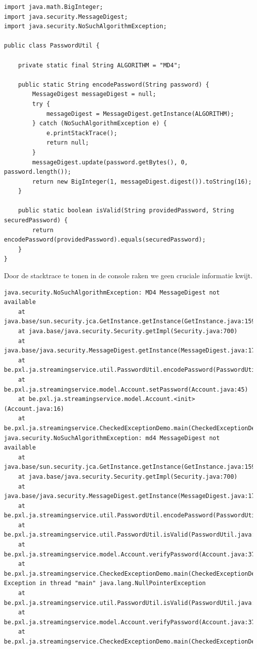 \documentclass{tstextbook}
\begin{document}
\begin{lstlisting}
import java.math.BigInteger;
import java.security.MessageDigest;
import java.security.NoSuchAlgorithmException;

public class PasswordUtil {

	private static final String ALGORITHM = "MD4";

	public static String encodePassword(String password) {
		MessageDigest messageDigest = null;
		try {
			messageDigest = MessageDigest.getInstance(ALGORITHM);
		} catch (NoSuchAlgorithmException e) {
			e.printStackTrace();
			return null;
		}
		messageDigest.update(password.getBytes(), 0, password.length());
		return new BigInteger(1, messageDigest.digest()).toString(16);
	}

	public static boolean isValid(String providedPassword, String securedPassword) {
		return encodePassword(providedPassword).equals(securedPassword);
	}
}
\end{lstlisting}
 
Door de stacktrace te tonen in de console raken we geen cruciale informatie kwijt.

\begin{verbatim}
java.security.NoSuchAlgorithmException: MD4 MessageDigest not available
	at java.base/sun.security.jca.GetInstance.getInstance(GetInstance.java:159)
	at java.base/java.security.Security.getImpl(Security.java:700)
	at java.base/java.security.MessageDigest.getInstance(MessageDigest.java:177)
	at be.pxl.ja.streamingservice.util.PasswordUtil.encodePassword(PasswordUtil.java:15)
	at be.pxl.ja.streamingservice.model.Account.setPassword(Account.java:45)
	at be.pxl.ja.streamingservice.model.Account.<init>(Account.java:16)
	at be.pxl.ja.streamingservice.CheckedExceptionDemo.main(CheckedExceptionDemo.java:8)
java.security.NoSuchAlgorithmException: md4 MessageDigest not available
	at java.base/sun.security.jca.GetInstance.getInstance(GetInstance.java:159)
	at java.base/java.security.Security.getImpl(Security.java:700)
	at java.base/java.security.MessageDigest.getInstance(MessageDigest.java:177)
	at be.pxl.ja.streamingservice.util.PasswordUtil.encodePassword(PasswordUtil.java:15)
	at be.pxl.ja.streamingservice.util.PasswordUtil.isValid(PasswordUtil.java:25)
	at be.pxl.ja.streamingservice.model.Account.verifyPassword(Account.java:37)
	at be.pxl.ja.streamingservice.CheckedExceptionDemo.main(CheckedExceptionDemo.java:9)
Exception in thread "main" java.lang.NullPointerException
	at be.pxl.ja.streamingservice.util.PasswordUtil.isValid(PasswordUtil.java:25)
	at be.pxl.ja.streamingservice.model.Account.verifyPassword(Account.java:37)
	at be.pxl.ja.streamingservice.CheckedExceptionDemo.main(CheckedExceptionDemo.java:9)
\end{verbatim}
\end{document}
